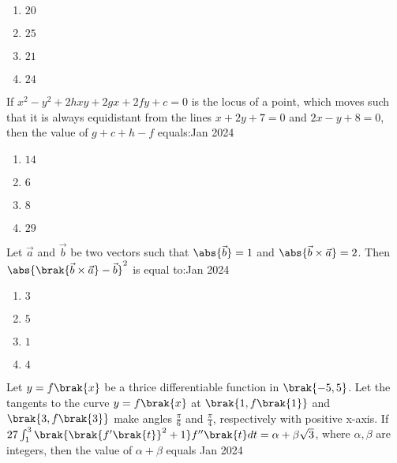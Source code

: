         \begin{multicols}{4}
        \begin{enumerate}
        \item $20$
        \item $25$
        \item $21$
        \item $24$
        \end{enumerate}
        \end{multicols}

    \item If $x^{2}-y^{2}+2hxy+2gx+2fy+c=0$ is the locus of a point, which moves such that it is always equidistant from the lines $x+2y+7=0$ and $2x-y+8=0$, then the value of $g+c+h-f$ equals:\hfill{Jan 2024}

        \begin{multicols}{4}
        \begin{enumerate}
        \item $14$
        \item $6$
        \item $8$
        \item $29$
        \end{enumerate}
        \end{multicols}

    \item Let $\vec{a}$ and $\vec{b}$ be two vectors such that $\abs{\vec{b}}=1$ and $\abs{\vec{b}\times\vec{a}}=2$. Then $\abs{\brak{\vec{b}\times\vec{a}}-\vec{b}}^{2}$ is equal to:\hfill{Jan 2024}

        \begin{multicols}{4}
        \begin{enumerate}
        \item $3$
        \item $5$
        \item $1$
        \item $4$
        \end{enumerate}
        \end{multicols}

    \item Let $y=f\brak{x}$ be a thrice differentiable function in $\brak{-5,5}$. Let the tangents to the curve $y=f\brak{x}$ at $\brak{1,f\brak{1}}$ and $\brak{3,f\brak{3}}$ make angles $\frac{\pi}{6}$ and $\frac{\pi}{4}$, respectively with positive x-axis. If $27\int_{1}^{3}\brak{\brak{f^{\prime}\brak{t}}^{2}+1}f^{\prime\prime}\brak{t}dt=\alpha+\beta\sqrt{3}$, where $\alpha,\beta$ are integers, then the value of $\alpha+\beta$ equals \hfill{Jan 2024}

